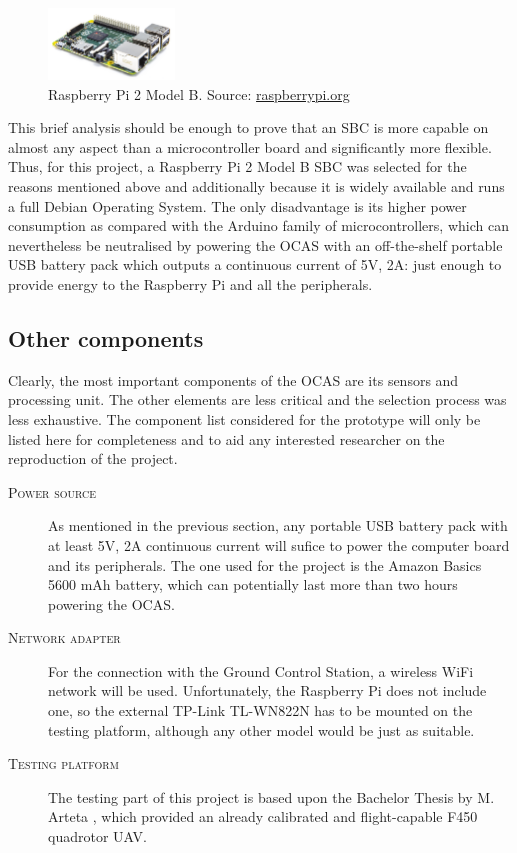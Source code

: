 \begin{figure}
	\centering
	\includegraphics[width=0.3\textwidth]{./figures/rpi.jpg}
	\caption{Raspberry Pi 2 Model B. {\footnotesize Source: \url{raspberrypi.org}}}
	\label{fig:rpi}
\end{figure}
This brief analysis should be enough to prove that an SBC is more capable on almost any aspect than a microcontroller board and significantly more flexible.
Thus, for this project, a Raspberry Pi 2 Model B SBC was selected for the reasons mentioned above and additionally because it is widely available and runs a full Debian Operating System.
The only disadvantage is its higher power consumption as compared with the Arduino family of microcontrollers, which can nevertheless be neutralised by powering the OCAS with an off-the-shelf portable USB battery pack which outputs a continuous current of 5V, 2A: just enough to provide energy to the Raspberry Pi and all the peripherals.

\subsection{Other components}

Clearly, the most important components of the OCAS are its sensors and processing unit.
The other elements are less critical and the selection process was less exhaustive.
The component list considered for the prototype will only be listed here for completeness and to aid any interested researcher on the reproduction of the project.

\begin{description}
	\item[\scshape Power source] As mentioned in the previous section, any portable USB battery pack with at least 5V, 2A continuous current will sufice to power the computer board and its peripherals.
		The one used for the project is the Amazon Basics 5600 mAh battery, which can potentially last more than two hours powering the OCAS.
	\item[\scshape Network adapter] For the connection with the Ground Control Station, a wireless WiFi network will be used.
		Unfortunately, the Raspberry Pi does not include one, so the external TP-Link TL-WN822N has to be mounted on the testing platform, although any other model would be just as suitable.
	\item[\scshape Testing platform] The testing part of this project is based upon the Bachelor Thesis by M. Arteta \cite{arteta2015}, which provided an already calibrated and flight-capable F450 quadrotor UAV.
\end{description}

